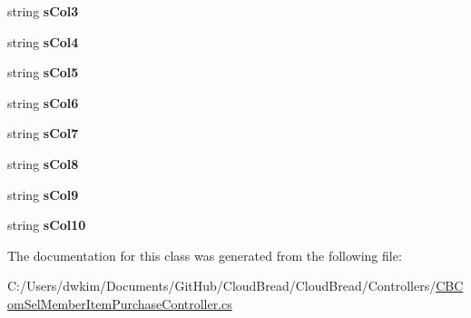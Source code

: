 \begin{DoxyCompactItemize}
\item 
string {\bfseries s\+Col3}\hypertarget{a00153_adeab588edca9db56abfe4fc7a133f1df}{}\label{a00153_adeab588edca9db56abfe4fc7a133f1df}

\item 
string {\bfseries s\+Col4}\hypertarget{a00153_a7d0ac129b63668bc599c25cceada072d}{}\label{a00153_a7d0ac129b63668bc599c25cceada072d}

\item 
string {\bfseries s\+Col5}\hypertarget{a00153_afd9f14c2425347fb75d0080e96b77750}{}\label{a00153_afd9f14c2425347fb75d0080e96b77750}

\item 
string {\bfseries s\+Col6}\hypertarget{a00153_a136215f9f2928197aec31ec9890e5cfa}{}\label{a00153_a136215f9f2928197aec31ec9890e5cfa}

\item 
string {\bfseries s\+Col7}\hypertarget{a00153_a28afb876dead3d383f4f453f14c7a94d}{}\label{a00153_a28afb876dead3d383f4f453f14c7a94d}

\item 
string {\bfseries s\+Col8}\hypertarget{a00153_a91edd028193e2a77e35607a354738fc6}{}\label{a00153_a91edd028193e2a77e35607a354738fc6}

\item 
string {\bfseries s\+Col9}\hypertarget{a00153_a3f0af21626476a5f22203c71c1bfdf9c}{}\label{a00153_a3f0af21626476a5f22203c71c1bfdf9c}

\item 
string {\bfseries s\+Col10}\hypertarget{a00153_ad333b6b72b49834c9c6a540568b27321}{}\label{a00153_ad333b6b72b49834c9c6a540568b27321}

\end{DoxyCompactItemize}


The documentation for this class was generated from the following file\+:\begin{DoxyCompactItemize}
\item 
C\+:/\+Users/dwkim/\+Documents/\+Git\+Hub/\+Cloud\+Bread/\+Cloud\+Bread/\+Controllers/\hyperlink{a00206}{C\+B\+Com\+Sel\+Member\+Item\+Purchase\+Controller.\+cs}\end{DoxyCompactItemize}
